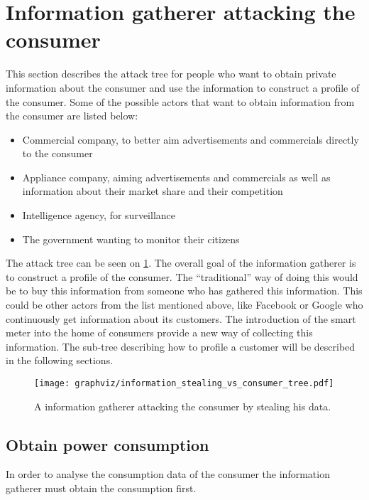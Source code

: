 \section{Information gatherer attacking the consumer}\label{informationGathererVsConsumer}
This section describes the attack tree for people who want to obtain private information about the consumer and use the information to construct a profile of the consumer.
Some of the possible actors that want to obtain information from the consumer are listed below:
\begin{itemize}
\item Commercial company, to better aim advertisements and commercials directly to the consumer
\item Appliance company, aiming advertisements and commercials as well as information about their market share and their competition
\item Intelligence agency, for surveillance
\item The government wanting to monitor their citizens
\end{itemize}

The attack tree can be seen on \cref{information_stealing_tree}.
The overall goal of the information gatherer is to construct a profile of the consumer.
The ``traditional'' way of doing this would be to buy this information from someone who has gathered this information.
This could be other actors from the list mentioned above, like Facebook or Google who continuously get information about its customers.
The introduction of the smart meter into the home of consumers provide a new way of collecting this information.
The sub-tree describing how to profile a customer will be described in the following sections.


\begin{figure}
  \begin{center}
    \texttt{[image: graphviz/information\_stealing\_vs\_consumer\_tree.pdf]}
  \end{center}
  \caption{A information gatherer attacking the consumer by stealing his data.}
  \label{information_stealing_tree}
\end{figure}

\subsection{Obtain power consumption}
In order to analyse the consumption data of the consumer the information gatherer must obtain the consumption first.


